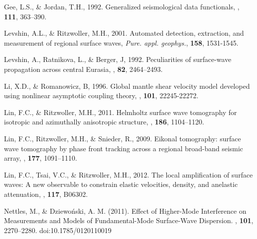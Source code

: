 \documentclass[referee]{gji}
\begin{document}
\begin{thebibliography}{}
	   Gee, L.S., \& Jordan, T.H., 1992. Generalized seismological data functionals, \textit{\gji}, \textbf{111}, 363–390.


	   Levshin, A.L., \& Ritzwoller, M.H., 2001. Automated detection, extraction, and measurement of regional surface waves, \textit{Pure. appl. geophys.}, \textbf{158}, 1531-1545.

	   Levshin, A., Ratnikova, L., \& Berger, J, 1992. Peculiarities of surface-wave propagation across central Eurasia, \textit{\bssa}, \textbf{82}, 2464–2493.

	   Li, X.D., \& Romanowicz, B, 1996. Global mantle shear velocity model developed using nonlinear asymptotic coupling theory, \textit{\jgr}, \textbf{101}, 22245-22272.

	   Lin, F.C., \& Ritzwoller, M.H., 2011. Helmholtz surface wave tomography for isotropic and azimuthally anisotropic structure, \textit{\gji}, \textbf{186}, 1104–1120.

	   Lin, F.C., Ritzwoller, M.H., \& Snieder, R., 2009. Eikonal tomography: surface wave tomography by phase front tracking across a regional broad-band seismic array, \textit{\gji}, \textbf{177}, 1091–1110. 

	   Lin, F.C., Tsai, V.C., \& Ritzwoller, M.H., 2012. The local amplification of surface waves: A new observable to constrain elastic velocities, density, and anelastic attenuation, \textit{\jgr}, \textbf{117}, B06302.

	   Nettles, M., \& Dziewoński, A. M. (2011). Effect of Higher-Mode Interference on Measurements and Models of Fundamental-Mode Surface-Wave Dispersion. \textit{\bssa}, \textbf{101}, 2270–2280. doi:10.1785/0120110019


\end{thebibliography}
\end{document}
